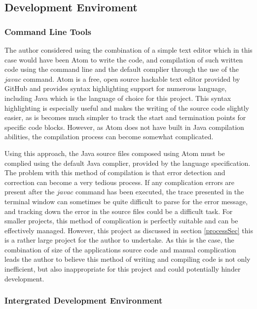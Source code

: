 \subsection{Development Enviroment}

\subsubsection{Command Line Tools}
\label{sseccmd}
The author considered using the combination of a simple text editor which in this case would have been Atom\cite{atom:textEditor} to write the code, and compilation of such written code using the command line and the default complier through the use of the $javac$ command. Atom is a free, open source hackable text editor provided by GitHub and provides syntax highlighting support for numerous language, including Java which is the language of choice for this project. This syntax highlighting is especially useful and makes the writing of the source code slightly easier, as is becomes much simpler to track the start and termination points for specific code blocks. However, as Atom does not have built in Java compilation abilities, the compilation process can become somewhat complicated.

Using this approach, the Java source files composed using Atom must be complied using the default Java complier, provided by the language specification. The problem with this method of compilation is that error detection and correction can become a very tedious process. If any complication errors are present after the $javac$ command has been executed, the trace presented in the terminal window can sometimes be quite difficult to parse for the error message, and tracking down the error in the source files could be a difficult task. For smaller projects, this method of complication is perfectly suitable and can be effectively managed. However, this project as discussed in section \ref{processSec} this is a rather large project for the author to undertake. As this is the case, the combination of size of the applications source code and manual complication leads the author to believe this method of writing and compiling code is not only inefficient, but also inappropriate for this project and could potentially hinder development.

\subsubsection{Intergrated Development Environment}

